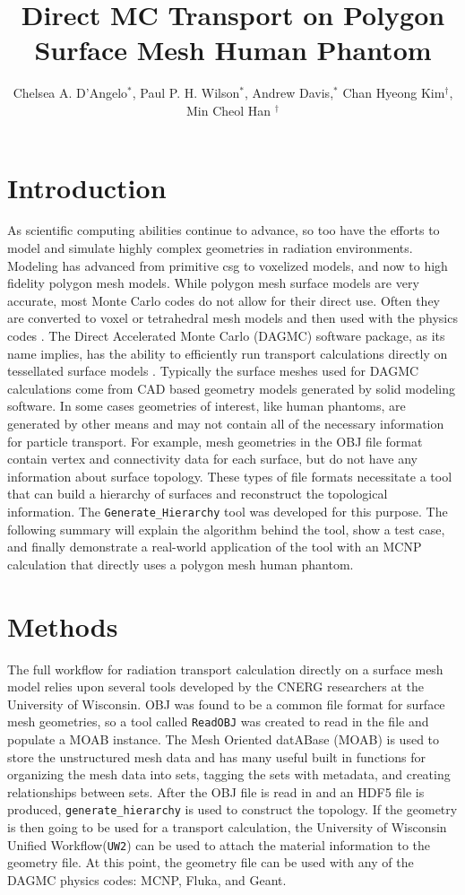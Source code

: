 \documentclass{anstrans}
\title{Direct MC Transport on Polygon Surface Mesh Human Phantom}
\author{Chelsea A. D'Angelo$^{*}$, Paul P. H. Wilson$^{*}$, Andrew Davis,$^{*}$
Chan Hyeong Kim$^{\dagger}$, Min Cheol Han $^{\dagger}$}
\institute{
$^{*}$Computational Nuclear Engineering Research Group, University of Wisconsin-Madison, Madison WI
\and
$^{\dagger}$Hanyang University, Seoul, Korea
}
\begin{document}
\section{Introduction}
As scientific computing abilities continue to advance, so too have the efforts to model
and simulate highly complex geometries in radiation environments.  Modeling has
advanced from primitive csg to voxelized models, and now to high fidelity polygon mesh 
models.  While polygon mesh surface models are very accurate, most Monte Carlo codes
do not allow for their direct use. Often they are converted to voxel or tetrahedral 
mesh models and then used with the physics codes \cite{tetmesh}.
The Direct Accelerated Monte Carlo (DAGMC) software package, as its name implies, 
has the ability to efficiently run transport calculations directly on tessellated
surface models \cite{dagmc}.  Typically the surface meshes used for DAGMC 
calculations come from CAD based geometry models generated by solid modeling software.
In some cases geometries of interest, like human phantoms, are generated by other 
means and may not contain all of the necessary information for particle transport. 
For example, mesh geometries in the OBJ file format contain vertex and connectivity
data for each surface, but do not have any information about surface topology.  
These types of file formats necessitate a tool that can build a hierarchy of 
surfaces and reconstruct the topological information.  The \texttt{Generate\_Hierarchy} 
tool was developed for this purpose.  The following summary will explain the algorithm
behind the tool, show a test case, and finally demonstrate a real-world application
of the tool with an MCNP calculation that directly uses a polygon mesh human phantom.
\section{Methods}

The full workflow for radiation transport calculation directly on a surface mesh model
relies upon several tools developed by the CNERG researchers at the University of Wisconsin.
OBJ was found to be a common file format for surface mesh geometries, so a tool called 
\texttt{ReadOBJ} was created to read in the file and populate a MOAB instance.
The Mesh Oriented datABase (MOAB) is used to store the unstructured mesh data 
and has many useful built in functions for organizing the mesh data into sets, 
tagging the sets with metadata, and creating relationships between sets.  
After the OBJ file is read in and an HDF5 file is produced, \texttt{generate\_hierarchy}
is used to construct the topology.  If the geometry is then going to be used 
for a transport calculation, the University of Wisconsin Unified Workflow(\texttt{UW2}) can be used to attach 
the material information to the geometry file.  At this point, the geometry file
can be used with any of the DAGMC physics codes: MCNP, Fluka, and Geant.
\end{document}
